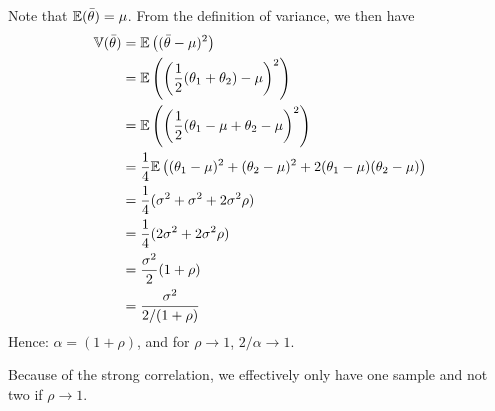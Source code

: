 \begin{exenumerate}
\begin{solution}
  
  Note that $\mathbb{E}(\bar{\theta}) = \mu$. From the definition of
  variance, we then have
  \begin{align}
    \mathbb{V}(\bar{\theta}) & = \mathbb{E}\left( (\bar{\theta} - \mu)^2\right)\\
    & = \mathbb{E}\left( \left(\frac{1}{2}(\theta_1+\theta_2) - \mu\right)^2\right) \\
    & =  \mathbb{E}\left( \left(\frac{1}{2}(\theta_1-\mu+\theta_2-\mu\right)^2\right) \\
    & =  \frac{1}{4} \mathbb{E}\left( (\theta_1-\mu)^2+(\theta_2-\mu)^2 + 2 (\theta_1-\mu) (\theta_2-\mu)\right) \\
    & =  \frac{1}{4} ( \sigma^2 + \sigma^2 + 2 \sigma^2 \rho) \\
    & =  \frac{1}{4} ( 2\sigma^2 + 2 \sigma^2 \rho) \\
    & =  \frac{\sigma^2}{2} ( 1 + \rho) \\
    & =  \frac{\sigma^2}{2/(1+\rho)}
  \end{align}
  Hence: $\alpha = (1+\rho)$, and for $\rho \to 1$, $2/\alpha \to 1$.
  
  Because of the strong correlation, we effectively only have one sample and not two if $\rho \to 1$.
  
\end{solution}

\end{exenumerate}

